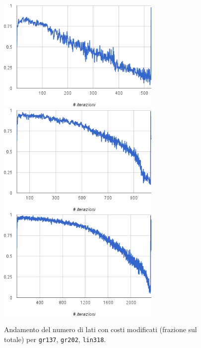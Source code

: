 \begin{figure}
  \begin{center}
    \includegraphics[width=0.7\textwidth]{images/gr137chgedges}
    \includegraphics[width=0.7\textwidth]{images/gr202chgedges}
    \includegraphics[width=0.7\textwidth]{images/lin318chgedges}
    \caption{Andamento del numero di lati con costi modificati (frazione sul totale) per \texttt{gr137}, \texttt{gr202}, \texttt{lin318}.}
    \label{fig:kvj3}
  \end{center}
\end{figure}

